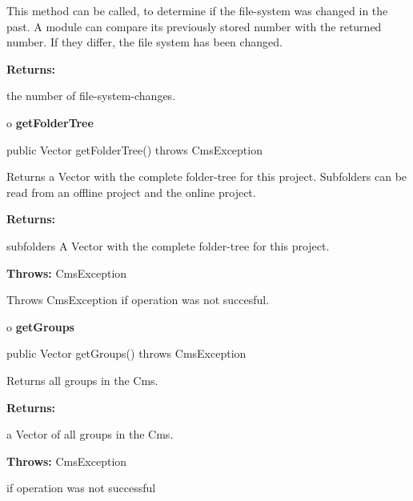 \begin{description}
\htmlDD This method can be called, to determine if the file-system was changed
in the past. \htmlBR
A module can compare its previously stored number with the returned number. If
they differ, the file system has been changed. 

\begin{description}
\item {\bf Returns:}  

the number of file-system-changes.  
\end{description}

\end{description}

o {\bf getFolderTree} 

\begin{PRE}
 public Vector getFolderTree() throws CmsException
\end{PRE}

\begin{description}
\htmlDD Returns a Vector with the complete folder-tree for this
project.\htmlBR
Subfolders can be read from an offline project and the online project. \htmlBR

\begin{description}
\item {\bf Returns:}  

subfolders A Vector with the complete folder-tree for this project.  
\item {\bf Throws:} CmsException  

Throws CmsException if operation was not succesful.  
\end{description}

\end{description}

o {\bf getGroups} 

\begin{PRE}
 public Vector getGroups() throws CmsException
\end{PRE}

\begin{description}
\htmlDD Returns all groups in the Cms. 

\begin{description}
\item {\bf Returns:}  

a Vector of all groups in the Cms.  
\item {\bf Throws:} CmsException  

if operation was not successful  
\end{description}

\end{description}

